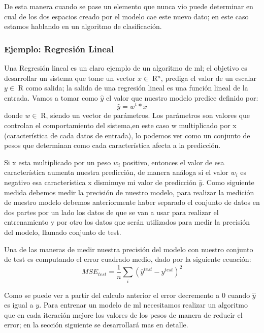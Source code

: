 De esta manera cuando se pase un elemento que nunca vio puede determinar en cual de los dos espacios creado por el modelo cae este nuevo dato; en este caso estamos hablando en un algoritmo de clasificación.

\subsubsection*{Ejemplo: Regresión Lineal}
Una Regresión lineal es un claro ejemplo de un algoritmo de \ac{ml}; el objetivo es desarrollar un sistema que tome un vector $x \in \; $R$^n$, prediga el valor de un escalar $y \in \; $R$ $ como salida; la salida de una regresión lineal es una función lineal de la entrada.  Vamos a tomar como $\hat{y}$ el valor que nuestro modelo predice definido por:
\begin{equation}
\hat{y} = w^t * x
\end{equation}
donde $w \in \; $R$ $, siendo un vector de parámetros.
Los parámetros son valores que controlan el comportamiento del sistema,en este caso w  multiplicado por x (característica de cada datos de entrada), lo podemos ver como un conjunto de pesos que determinan como cada característica afecta a la predicción.

Si x esta multiplicado por un peso $w_i $ positivo, entonces el valor de esa característica aumenta nuestra predicción, de manera análoga si el valor $w_i $ es negativo esa característica x disminuye mi valor de predicción $\hat{y}$.
Como siguiente medida debemos medir la precisión de nuestro modelo, para realizar la medición de nuestro modelo debemos anteriormente haber separado el conjunto de datos en dos partes por un lado los datos de que se van a usar para realizar el entrenamiento y por otro los datos que serán utilizados para medir la precisión del modelo, llamado conjunto de test.

Una de las maneras de medir nuestra precisión del modelo con nuestro conjunto de test es computando el error cuadrado medio, dado por la siguiente ecuación:
\begin{equation}\label{eqn:mse} 
MSE_{test} = \frac{1}{n}\sum_{i}(\hat{y}^{test}- y^{test})^2
\end{equation}

Como se puede ver a partir del calculo anterior el error decremento a 0 cuando $\hat{y}$ es igual a $y$. Para entrenar un modelo de \ac{ml} necesitamos realizar un algoritmo que en cada iteración mejore los valores de los pesos de manera de reducir el error; en la sección siguiente se desarrollará mas en detalle.

